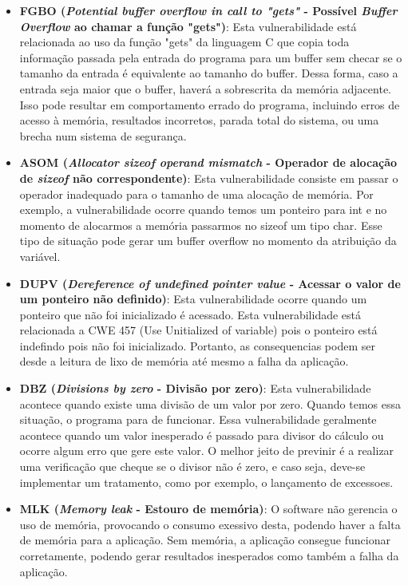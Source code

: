 \begin{itemize}
\item \textbf{FGBO (\emph{Potential buffer overflow in call to "gets" } - Possível \emph{Buffer Overflow} ao chamar a função "gets")}: Esta vulnerabilidade está relacionada ao uso da função "gets" da linguagem C que copia toda informação passada pela entrada do programa para um buffer sem checar se o tamanho da entrada é equivalente ao tamanho do buffer. Dessa forma, caso a entrada seja maior que o buffer, haverá a sobrescrita da memória adjacente. Isso pode resultar em comportamento errado do programa, incluindo erros de acesso à memória, resultados incorretos, parada total do sistema, ou uma brecha num sistema de segurança.


\item \textbf{ASOM (\emph{Allocator sizeof operand mismatch } - Operador de alocação de \emph{sizeof} não correspondente)}:
%
Esta vulnerabilidade consiste em passar o operador inadequado para o tamanho de uma alocação de memória. Por exemplo, a vulnerabilidade ocorre quando temos um ponteiro para int e no momento de alocarmos a memória passarmos no sizeof um tipo char. Esse tipo de situação pode gerar um buffer overflow no momento da atribuição da variável.

\item \textbf{DUPV (\emph{Dereference of undefined pointer value } - Acessar o valor de um ponteiro não definido)}:
%
Esta vulnerabilidade ocorre quando um ponteiro que não foi inicializado é acessado. Esta vulnerabilidade está relacionada a CWE 457 (Use Unitialized of variable) pois o ponteiro está indefindo pois não foi inicializado. Portanto, as consequencias podem ser desde a leitura de lixo de memória até mesmo a falha da aplicação.

\item \textbf{DBZ (\emph{Divisions by zero } - Divisão por zero)}:
%
Esta vulnerabilidade acontece quando existe uma divisão de um valor por zero. Quando temos essa situação, o programa para de funcionar. Essa vulnerabilidade geralmente acontece quando um valor inesperado é passado para divisor do cálculo ou ocorre algum erro que gere este valor. O melhor jeito de previnir é a realizar uma verificação que cheque se o divisor não é zero, e caso seja, deve-se implementar um tratamento, como por exemplo, o lançamento de excessoes.

\item \textbf{MLK (\emph{Memory leak } - Estouro de memória)}:
%
O software não gerencia o uso de memória, provocando o consumo exessivo desta, podendo haver a falta de memória para a aplicação. Sem memória, a aplicação consegue funcionar corretamente, podendo gerar resultados inesperados como também a falha da aplicação.


\end{itemize}
